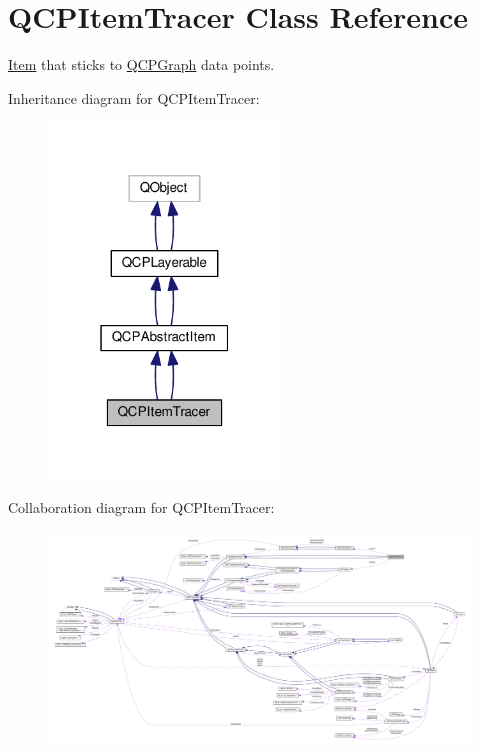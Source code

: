 \hypertarget{class_q_c_p_item_tracer}{}\section{Q\+C\+P\+Item\+Tracer Class Reference}
\label{class_q_c_p_item_tracer}


\hyperlink{class_item}{Item} that sticks to \hyperlink{class_q_c_p_graph}{Q\+C\+P\+Graph} data points.  




Inheritance diagram for Q\+C\+P\+Item\+Tracer\+:\nopagebreak
\begin{figure}[H]
\begin{center}
\leavevmode
\includegraphics[width=175pt]{class_q_c_p_item_tracer__inherit__graph}
\end{center}
\end{figure}


Collaboration diagram for Q\+C\+P\+Item\+Tracer\+:\nopagebreak
\begin{figure}[H]
\begin{center}
\leavevmode
\includegraphics[width=350pt]{class_q_c_p_item_tracer__coll__graph}
\end{center}
\end{figure}
